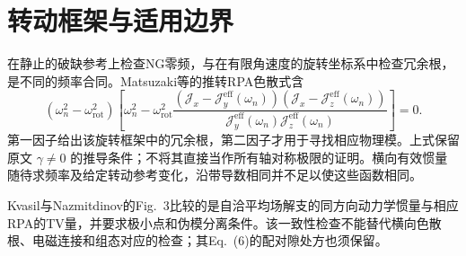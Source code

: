 \section{转动框架与适用边界}\label{app:C-rotating-response}

在静止的破缺参考上检查NG零频，与在有限角速度的旋转坐标系中检查冗余根，是不同的频率合同。Matsuzaki等的推转RPA色散式含
\begin{equation}\label{eq:app-c-matsuzaki-factorization}
(\omega_n^2-\omega_{\mathrm{rot}}^2)
\left[
\omega_n^2-\omega_{\mathrm{rot}}^2
\frac{
(\mathcal J_x-\mathcal J_y^{\mathrm{eff}}(\omega_n))
(\mathcal J_x-\mathcal J_z^{\mathrm{eff}}(\omega_n))
}{
\mathcal J_y^{\mathrm{eff}}(\omega_n)
\mathcal J_z^{\mathrm{eff}}(\omega_n)
}
\right]=0 .
\end{equation}
第一因子给出该旋转框架中的冗余根，第二因子才用于寻找相应物理模。上式保留原文 \(\gamma\ne0\) 的推导条件；不将其直接当作所有轴对称极限的证明。横向有效惯量随待求频率及给定转动参考变化，沿带导数相同并不足以使这些函数相同。\cite[PDF~p.~4, Eqs.~(11)--(12)]{matsuzaki-2004-nuclear-inertia-and-wobbling}

Kvasil与Nazmitdinov的Fig.~3比较的是自洽平均场解支的同方向动力学惯量与相应RPA的TV量，并要求极小点和伪模分离条件。该一致性检查不能替代横向色散根、电磁连接和组态对应的检查；其Eq.~(6)的配对隙处方也须保留。\cite[PDF~pp.~3--4, Eq.~(6), Fig.~3]{kvasil-2006-dy156-yb162-crpa-wobbling}
